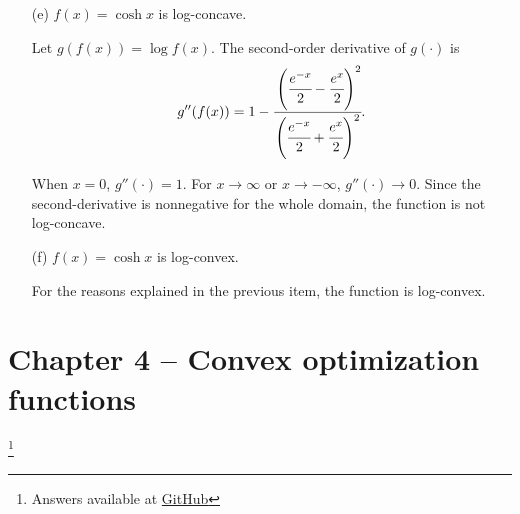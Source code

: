 \documentclass[11pt,a4paper]{article}
\begin{document}
\begin{itemize}
\begin{itemize}
        \item[(e)] $f(x) = \cosh x$ is log-concave.
        
        Let $g(f(x)) = \log f(x)$. The second-order derivative of $g(\cdot)$ is 
        \begin{equation*}
            g''(f(x)) = 1 - \cfrac{\left(\cfrac{e^{-x}}{2} - \cfrac{e^{x}}{2}\right)^2}{\left(\cfrac{e^{-x}}{2} + \cfrac{e^{x}}{2}\right)^2}.
        \end{equation*}

        When $x = 0$, $g''(\cdot) = 1$. For $x \to \infty$ or $x \to -\infty$, $g''(\cdot) \to 0$. Since the second-derivative is nonnegative for the whole domain, the function is not log-concave.

        \item[(f)] $f(x) = \cosh x$ is log-convex.
        
        For the reasons explained in the previous item, the function is log-convex. 
    \end{itemize}
\end{itemize}

\section*{Chapter 4 -- Convex optimization functions}\footnote{Answers available at \href{URL}{GitHub}}
\end{document}

